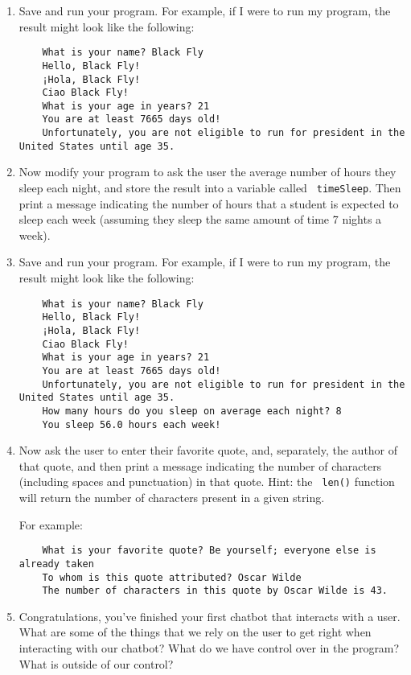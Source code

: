 \documentclass[10pt]{article}
\begin{document}
\begin{enumerate}
    \item Save and run your program.  
        For example, if I were to run my program, the result might look like
        the following:
\begin{verbatim}
    What is your name? Black Fly
    Hello, Black Fly!
    ¡Hola, Black Fly!
    Ciao Black Fly!
    What is your age in years? 21
    You are at least 7665 days old!
    Unfortunately, you are not eligible to run for president in the United States until age 35.
\end{verbatim}

    \item Now modify your program to ask the user the average number of hours
    they sleep each night, and store the result into a variable called {\tt
    timeSleep}. 
    Then print a message indicating the number of hours that a student is
    expected to sleep each week (assuming they sleep the same amount of time 7 nights a week).

    \item Save and run your program.
        For example, if I were to run my program, the result might look like
        the following:
\begin{verbatim}
    What is your name? Black Fly
    Hello, Black Fly!
    ¡Hola, Black Fly!
    Ciao Black Fly!
    What is your age in years? 21
    You are at least 7665 days old!
    Unfortunately, you are not eligible to run for president in the United States until age 35.
    How many hours do you sleep on average each night? 8
    You sleep 56.0 hours each week!
\end{verbatim}

    \item Now ask the user to enter their favorite quote, and, separately,
the author of that quote, and then print a message indicating the number of
characters (including spaces and punctuation) in that quote.  Hint: the {\tt
len()} function will return the number of characters present in a given string.

For example:
\begin{verbatim}
    What is your favorite quote? Be yourself; everyone else is already taken
    To whom is this quote attributed? Oscar Wilde
    The number of characters in this quote by Oscar Wilde is 43.
\end{verbatim}

\item Congratulations, you've finished your first chatbot that interacts with a user. What are some of the things that we rely on the user to get right when interacting with our chatbot? What do we have control over in the program? What is outside of our control?

  \end{enumerate}
\end{document}
